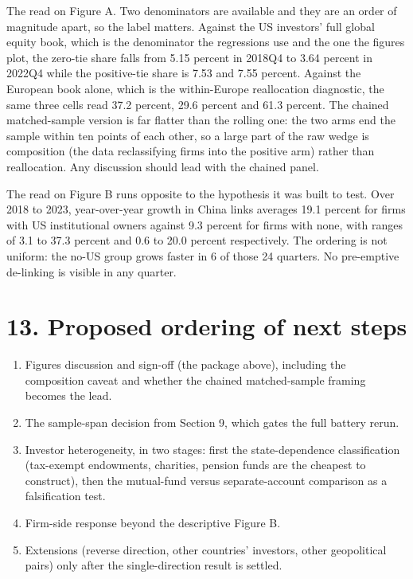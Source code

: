 \documentclass[11pt]{article}
\begin{document}
The read on Figure A. Two denominators are available and they are an order of
magnitude apart, so the label matters. Against the US investors' full global
equity book, which is the denominator the regressions use and the one the
figures plot, the zero-tie share falls from 5.15 percent in 2018Q4 to 3.64
percent in 2022Q4 while the positive-tie share is 7.53 and 7.55 percent.
Against the European book alone, which is the within-Europe reallocation
diagnostic, the same three cells read 37.2 percent, 29.6 percent and 61.3
percent. The chained matched-sample version is far flatter than the rolling
one: the two arms end the sample within ten points of each other, so a large
part of the raw wedge is composition (the data reclassifying firms into the
positive arm) rather than reallocation. Any discussion should lead with the
chained panel.

The read on Figure B runs opposite to the hypothesis it was built to test.
Over 2018 to 2023, year-over-year growth in China links averages 19.1 percent
for firms with US institutional owners against 9.3 percent for firms with
none, with ranges of 3.1 to 37.3 percent and 0.6 to 20.0 percent respectively.
The ordering is not uniform: the no-US group grows faster in 6 of those 24
quarters. No pre-emptive de-linking is visible in any quarter.

\section*{13. Proposed ordering of next steps}

\begin{enumerate}
\item Figures discussion and sign-off (the package above), including the
composition caveat and whether the chained matched-sample framing becomes the
lead.
\item The sample-span decision from Section 9, which gates the full battery
rerun.
\item Investor heterogeneity, in two stages: first the state-dependence
classification (tax-exempt endowments, charities, pension funds are the
cheapest to construct), then the mutual-fund versus separate-account
comparison as a falsification test.
\item Firm-side response beyond the descriptive Figure B.
\item Extensions (reverse direction, other countries' investors, other
geopolitical pairs) only after the single-direction result is settled.
\end{enumerate}
\end{document}
